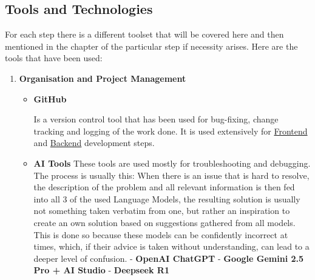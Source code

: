 \subsection{Tools and Technologies}
For each step there is a different toolset that will be covered here and then mentioned in the chapter of the particular step if necessity arises. Here are the tools that have been used:

\begin{enumerate}
	\item \textbf{Organisation and Project Management}
	\begin{itemize}
		\item\textbf{GitHub}
		
		Is a version control tool that has been used for bug-fixing, change tracking and logging of the work done. It is used extensively for \hyperref[sec:FrontenddDev]{Frontend} and \hyperref[sec:Backenddev]{Backend} development steps. 
		\item\textbf{AI Tools}
		\newline These tools are used mostly for troubleshooting and debugging. The process is usually this: When there is an issue that is hard to resolve, the description of the problem and all relevant information is then fed into all 3 of the used Language Models, the resulting solution is usually not something taken verbatim from one, but rather an inspiration to create an own solution based on suggestions gathered from all models. This is done so because these models can be confidently incorrect at times, which, if their advice is taken without understanding, can lead to a deeper level of confusion.
		\newline - \textbf{OpenAI ChatGPT}
		\newline - \textbf{Google Gemini 2.5 Pro + AI Studio}
		\newline - \textbf{Deepseek R1}
		
	\end{itemize}
\end{enumerate}